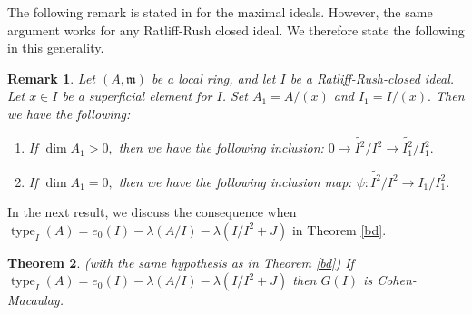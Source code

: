 \documentclass[11pt]{amsart}
\theoremstyle{plain}
\newtheorem{theorem}{Theorem}[section]
\newtheorem{remark}[theorem]{Remark}
\newcommand{\m}{\mathfrak{m}}
\newcommand{\wt}{\widetilde}
\newcommand{\type}{\operatorname{type}}
\theoremstyle{plain}
\begin{document}
The following remark is stated in \cite[3.1]{ankit} for the maximal ideals. However, the same argument works for any Ratliff-Rush closed ideal. We therefore state the following in this generality.

\begin{remark} \label{imprmk} \normalfont 
    Let $(A,\m)$ be a local ring, and let $I$ be a Ratliff-Rush-closed ideal. Let $x\in I$ be a superficial element for $I$. Set $A_{1}=A/(x)$ and $I_1=I/(x).$ Then we have the following:
    \begin{enumerate}[{(i)}]
        \item If $\dim A_{1}>0,$ then  we have the following inclusion: $0\longrightarrow \wt{I^2}/I^2\longrightarrow \wt{I_1^2}/I_1^2.$
        \item If $\dim A_{1}=0,$ then  we have the following inclusion map: $\psi:\wt{I^2}/I^2\longrightarrow {I_1}/I_1^2.$
    \end{enumerate}
\end{remark}
In the next result, we discuss the consequence when $\type_I(A) = e_{0}(I)-\lambda(A/I)-\lambda(I/I^{2}+J)$ in Theorem \ref{bd}.  %


\begin{theorem}
    \label{typeq}
    (with the same hypothesis as in Theorem \ref{bd}) If $\type_I(A) = e_{0}(I)-\lambda(A/I)-\lambda(I/I^{2}+J)$ then $G(I)$ is Cohen-Macaulay.
\end{theorem}
\end{document}
